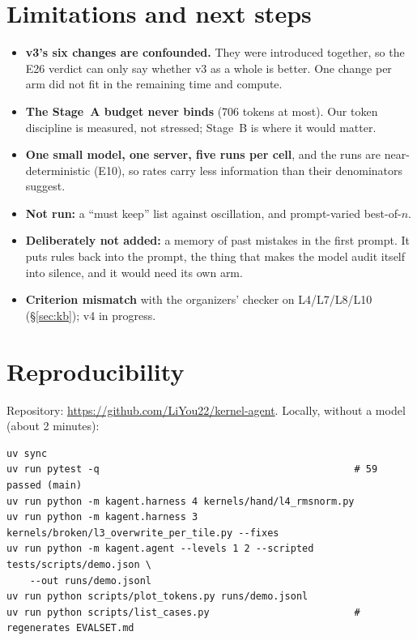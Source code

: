 \documentclass[11pt]{article}
\newcommand{\E}[1]{E#1}
\begin{document}
\section{Limitations and next steps}
\label{sec:limits}
\begin{itemize}
  \item \textbf{v3's six changes are confounded.} They were introduced together, so the E26 verdict can
        only say whether v3 as a whole is better. One change per arm did not fit in the remaining time
        and compute.
  \item \textbf{The Stage~A budget never binds} (706 tokens at most). Our token discipline is measured,
        not stressed; Stage~B is where it would matter.
  \item \textbf{One small model, one server, five runs per cell}, and the runs are near-deterministic
        (\E{10}), so rates carry less information than their denominators suggest.
  \item \textbf{Not run:} a ``must keep'' list against oscillation, and prompt-varied best-of-$n$.
  \item \textbf{Deliberately not added:} a memory of past mistakes in the first prompt. It puts rules
        back into the prompt, the thing that makes the model audit itself into silence, and it would need
        its own arm.
  \item \textbf{Criterion mismatch} with the organizers' checker on L4/L7/L8/L10 (\S\ref{sec:kb}); v4 in
        progress.
\end{itemize}

\section{Reproducibility}
Repository: \url{https://github.com/LiYou22/kernel-agent}. Locally, without a model (about 2 minutes):

\begin{small}
\begin{verbatim}
uv sync
uv run pytest -q                                            # 59 passed (main)
uv run python -m kagent.harness 4 kernels/hand/l4_rmsnorm.py
uv run python -m kagent.harness 3 kernels/broken/l3_overwrite_per_tile.py --fixes
uv run python -m kagent.agent --levels 1 2 --scripted tests/scripts/demo.json \
    --out runs/demo.jsonl
uv run python scripts/plot_tokens.py runs/demo.jsonl
uv run python scripts/list_cases.py                         # regenerates EVALSET.md
\end{verbatim}
\end{small}
\end{document}
